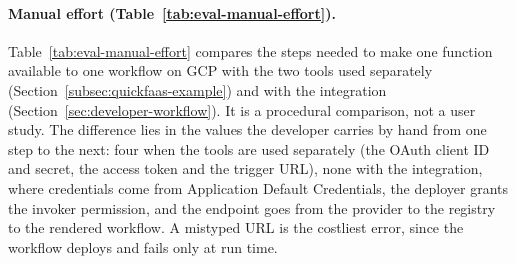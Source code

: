 \paragraph{Manual effort (Table~\ref{tab:eval-manual-effort}).}
Table~\ref{tab:eval-manual-effort} compares the steps needed to make one function available to one
workflow on GCP with the two tools used separately (Section~\ref{subsec:quickfaas-example}) and
with the integration (Section~\ref{sec:developer-workflow}). It is a procedural comparison, not a
user study. The difference lies in the values the developer carries by hand from one step to the
next: four when the tools are used separately (the OAuth client ID and secret, the access token and
the trigger URL), none with the integration, where credentials come from Application Default
Credentials, the deployer grants the invoker permission, and the endpoint goes from the provider to
the registry to the rendered workflow. A mistyped URL is the costliest error, since the workflow
deploys and fails only at run time.


